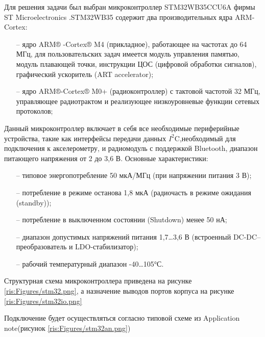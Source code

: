 \begin{sloppypar}
Для решения задачи был выбран микроконтроллер STM32WB35CCU6A фирмы ST Microelectronics \cite {STM}.STM32WB35 содержит два производительных ядра ARM-Cortex:
\begin{onehalfspace}
	\begin{itemize}
		\item[--] ядро ARM® -Cortex® M4 (прикладное), работающее на частотах до 64 МГц, для пользовательских задач имеется модуль управления памятью, модуль плавающей точки, инструкции ЦОС (цифровой обработки сигналов), графический ускоритель (ART accelerator);
		\item[--] ядро ARM®-Cortex® M0+ (радиоконтроллер) с тактовой частотой 32 МГц, управляющее радиотрактом и реализующее низкоуровневые функции сетевых протоколов;
	\end{itemize}
\end{onehalfspace}
Данный микроконтроллер включает в себя все необходимые периферийные устройства, такие как интерфейсы передачи данных $I^2$C,необходимый для подключения к акселерометру, и радиомодуль с поддержкой Bluetooth, диапазон питающего напряжения от 2 до 3,6 В. 
Основные характеристики:
\begin{onehalfspace}
	\begin{itemize}
		\item[--] типовое энергопотребление 50 мкА/МГц (при напряжении питания 3 В);
		\item[--] потребление в режиме останова 1,8 мкА (радиочасть в режиме ожидания (standby));
		\item[--] потребление в выключенном состоянии (Shutdown) менее 50 нА;
		\item[--] диапазон допустимых напряжений питания 1,7…3,6 В (встроенный DC-DC–преобразователь и LDO-стабилизатор);
		\item[--] рабочий температурный диапазон -40…105°С.
	\end{itemize}
\end{onehalfspace}
Структурная схема микроконтроллера приведена на рисунке \ref{ris:Figures/stm32.png}, а назначение выводов портов корпуса на рисунке \ref{ris:Figures/stm32io.png}


Подключение будет осуществляться согласно типовой схеме из Application note\cite {STM_an}(рисунок \ref{ris:Figures/stm32an.png})




\end{sloppypar}
